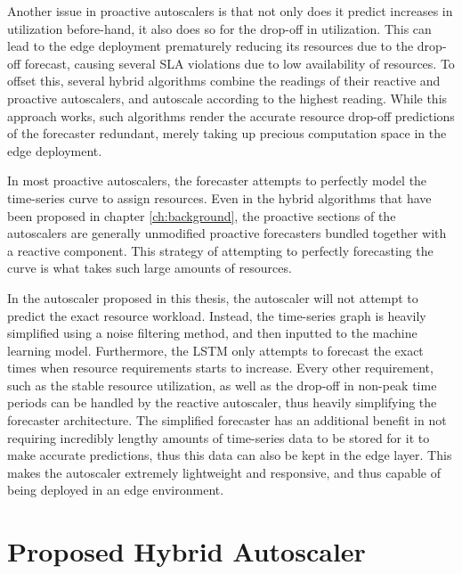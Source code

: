 Another issue in proactive autoscalers is that not only does it predict increases in utilization before-hand, it also does so for the drop-off in utilization. This can lead to the edge deployment prematurely reducing its resources due to the drop-off forecast, causing several SLA violations due to low availability of resources. To offset this, several hybrid algorithms combine the readings of their reactive and proactive autoscalers, and autoscale according to the highest reading. While this approach works, such algorithms render the accurate resource drop-off predictions of the forecaster redundant, merely taking up precious computation space in the edge deployment.\par

In most proactive autoscalers, the forecaster attempts to perfectly model the time-series curve to assign resources. Even in the hybrid algorithms that have been proposed in chapter \ref{ch:background}, the proactive sections of the autoscalers are generally unmodified proactive forecasters bundled together with a reactive component. This strategy of attempting to perfectly forecasting the curve is what takes such large amounts of resources.\par

In the autoscaler proposed in this thesis, the autoscaler will not attempt to predict the exact resource workload. Instead, the time-series graph is heavily simplified using a noise filtering method, and then inputted to the machine learning model. Furthermore, the LSTM only attempts to forecast the exact times when resource requirements starts to increase. Every other requirement, such as the stable resource utilization, as well as the drop-off in non-peak time periods can be handled by the reactive autoscaler, thus heavily simplifying the forecaster architecture. The simplified forecaster has an additional benefit in not requiring incredibly lengthy amounts of time-series data to be stored for it to make accurate predictions, thus this data can also be kept in the edge layer. This makes the autoscaler extremely lightweight and responsive, and thus capable of being deployed in an edge environment.\par

\section{Proposed Hybrid Autoscaler}
\label{sec:ch3-hybrid-autoscale-overview} 

